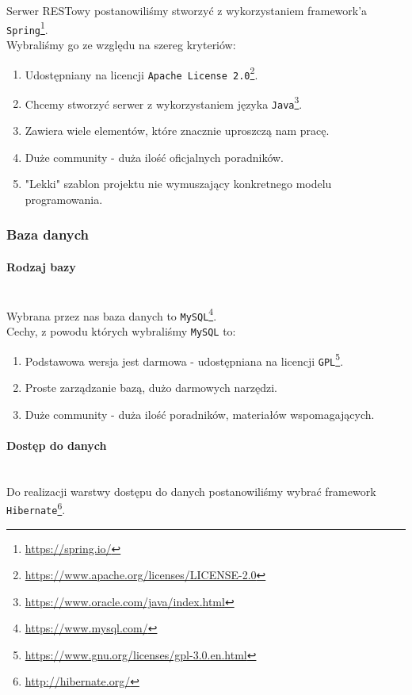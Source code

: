 \documentclass[12pt,a4paper]{report}
\begin{document}
Serwer RESTowy postanowiliśmy stworzyć z wykorzystaniem framework'a \texttt{Spring}\footnote{\url{https://spring.io/}}.~\\

Wybraliśmy go ze względu na szereg kryteriów:
\begin{enumerate}
\item Udostępniany na licencji \texttt{Apache License 2.0}\footnote{\url{https://www.apache.org/licenses/LICENSE-2.0}}.
\item Chcemy stworzyć serwer z wykorzystaniem języka \texttt{Java}\footnote{\url{https://www.oracle.com/java/index.html}}.
\item Zawiera wiele elementów, które znacznie uproszczą nam pracę.
\item Duże community - duża ilość oficjalnych poradników.
\item "Lekki" szablon projektu nie wymuszający konkretnego modelu programowania.
\end{enumerate}

\subsubsection{Baza danych}

\paragraph{Rodzaj bazy}~\\

Wybrana przez nas baza danych to \texttt{MySQL}\footnote{\url{https://www.mysql.com/}}.~\\

Cechy, z powodu których wybraliśmy \texttt{MySQL} to:
\begin{enumerate}
\item Podstawowa wersja jest darmowa - udostępniana na licencji \texttt{GPL}\footnote{\url{https://www.gnu.org/licenses/gpl-3.0.en.html}}.
\item Proste zarządzanie bazą, dużo darmowych narzędzi.
\item Duże community - duża ilość poradników, materiałów wspomagających.
\end{enumerate}

\paragraph{Dostęp do danych}~\\

Do realizacji warstwy dostępu do danych postanowiliśmy wybrać framework \texttt{Hibernate}\footnote{\url{http://hibernate.org/}}.~\\
\end{document}
